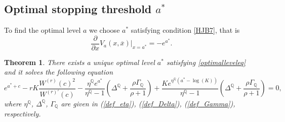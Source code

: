 \documentclass[10pt,a4paper]{amsart}
\def\Q{{\mathbb{Q}}}
\newtheorem{Thm}{Theorem}
\begin{document}
		\subsection{Optimal stopping threshold $a^*$}
		To find the optimal level $a$ we choose $a^*$ satisfying condition \eqref{HJB7}, that is 
		\begin{equation}\label{optimalleveleq}\frac{\partial}{\partial x} V_a(x, \overline{x})\big|_{x = a^*}=-e^{a^*}.\end{equation}
		\begin{Thm}
			There exists a unique optimal level $a^*$ satisfying \eqref{optimalleveleq} and it solves the following equation
			\begin{equation}\label{otimala*}
				e^{a^*+c} - rK \frac{W^{(r)}(c)^2}{W^{(r)'}(c)} -  \frac{\eta^\Q e^{a^*}}{\eta^\Q-1}\left( \Delta^\Q + \frac{\rho\Gamma_\Q}{\rho+1} \right)  + \frac{Ke^{\eta^\Q(a^*-\log(K))}}{\eta^\Q-1}\left( \Delta^\Q + \frac{\rho\Gamma_\Q}{\rho+1} \right)
				=0,
			\end{equation}
			where $\eta^\Q$, $\Delta^\Q$, $\Gamma_\Q$ are given in (\ref{def_eta}), (\ref{def_Delta}), (\ref{def_Gamma}), respectively.
		\end{Thm}
\end{document}
